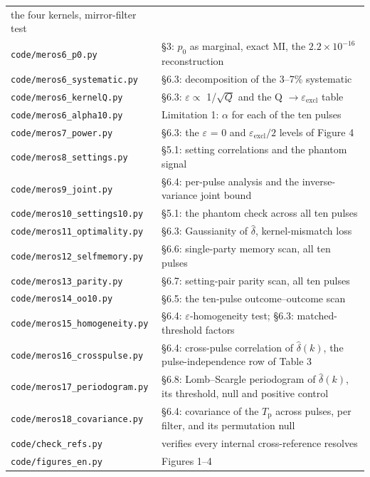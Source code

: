 \documentclass[
  11pt,
]{article}
\begin{document}
\begin{longtable}[]{@{}
  >{\raggedright\arraybackslash}p{}
  >{\raggedright\arraybackslash}p{}@{}}
the four kernels, mirror-filter test \\
\texttt{code/meros6\_p0.py} & \S3: \(p_{0}\) as marginal, exact MI, the
\(2.2 \times 10^{-16}\) reconstruction \\
\texttt{code/meros6\_systematic.py} & \S6.3: decomposition of the 3--7\%
systematic \\
\texttt{code/meros6\_kernelQ.py} & \S6.3: \(\varepsilon \propto\)
1/\(\sqrt{Q}\) and the Q \(\rightarrow \varepsilon_{\mathrm{excl}}\)
table \\
\texttt{code/meros6\_alpha10.py} & Limitation 1: \(\alpha\) for each of
the ten pulses \\
\texttt{code/meros7\_power.py} & \S6.3: the \(\varepsilon\) = 0 and
\(\varepsilon_{\mathrm{excl}}/2\) levels of Figure 4 \\
\texttt{code/meros8\_settings.py} & \S5.1: setting correlations and the
phantom signal \\
\texttt{code/meros9\_joint.py} & \S6.4: per-pulse analysis and the
inverse-variance joint bound \\
\texttt{code/meros10\_settings10.py} & \S5.1: the phantom check across
all ten pulses \\
\texttt{code/meros11\_optimality.py} & \S6.3: Gaussianity of
\(\hat\delta\), kernel-mismatch loss \\
\texttt{code/meros12\_selfmemory.py} & \S6.6: single-party memory scan,
all ten pulses \\
\texttt{code/meros13\_parity.py} & \S6.7: setting-pair parity scan, all
ten pulses \\
\texttt{code/meros14\_oo10.py} & \S6.5: the ten-pulse outcome--outcome
scan \\
\texttt{code/meros15\_homogeneity.py} & \S6.4:
\(\varepsilon\)-homogeneity test; \S6.3: matched-threshold factors \\
\texttt{code/meros16\_crosspulse.py} & \S6.4: cross-pulse correlation of
\(\hat\delta(k)\), the pulse-independence row of Table 3 \\
\texttt{code/meros17\_periodogram.py} & \S6.8: Lomb--Scargle periodogram
of \(\hat\delta(k)\), its threshold, null and positive control \\
\texttt{code/meros18\_covariance.py} & \S6.4: covariance of the
\(T_{\mathrm{p}}\) across pulses, per filter, and its permutation
null \\
\texttt{code/check\_refs.py} & verifies every internal cross-reference
resolves \\
\texttt{code/figures\_en.py} & Figures 1--4 \\
\end{longtable}
\end{document}
